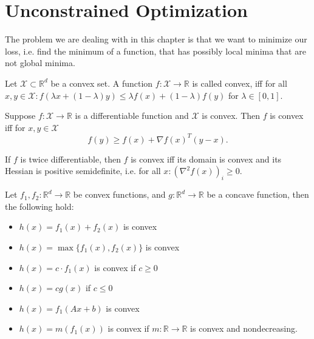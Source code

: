 \documentclass[12 pt]{article}        	%
\begin{document}
\section{Unconstrained Optimization}

The problem we are dealing with in this chapter is that we want to minimize our loss, i.e. find the minimum of a function, that has possibly local minima that are not global minima.

\begin{defi}
    Let $ \mathcal{ X } \subset \mathbb{ R }^d $ be a convex set.
    A function $ f \colon \mathcal{ X } \to \mathbb{ R } $ is called convex, iff for all $ x , y \in \mathcal{ X } \colon f ( \lambda x + ( 1 - \lambda ) y ) \leq \lambda f ( x ) + ( 1 - \lambda ) f ( y ) $ for $ \lambda \in [ 0 , 1 ] $.
\end{defi}

\begin{thm}
    Suppose $ f \colon \mathcal{ X } \to \mathbb{ R } $ is a differentiable function and $ \mathcal{ X } $ is convex. 
    Then $ f $ is convex iff for $ x , y \in \mathcal{ X } $
    \[
        f ( y ) \geq f ( x ) + \nabla f ( x )^T ( y - x ).
    \]
\end{thm}

\begin{lem}
    If $ f $ is twice differentiable, then $ f $ is convex iff its domain is convex and its Hessian is positive semidefinite, i.e. for all $ x  \colon ( \nabla^2 f ( x ) )_i \geq 0 $.
\end{lem}

\begin{prop}
    Let $ f_1 , f_2 \colon \mathbb{ R }^d \to \mathbb{ R } $ be convex functions, and $ g \colon \mathbb{ R }^d \to \mathbb{ R } $ be a concave function, then the following hold:
    \begin{itemize}
        \item 
        $ h ( x ) = f_1 ( x ) + f_2 ( x ) $ is convex 

        \item 
        $ h ( x ) = \max \{ f_1 ( x ) , f_2 ( x ) \} $ is convex

        \item 
        $ h ( x ) = c \cdot f_1 ( x ) $ is convex if $ c \geq 0 $

        \item 
        $ h ( x ) = c g ( x ) $ if $ c \leq 0 $

        \item 
        $ h ( x ) = f_1 ( A x + b ) $ is convex

        \item 
        $ h ( x ) = m ( f_1 ( x ) ) $ is convex if $ m \colon \mathbb{ R } \to \mathbb{ R } $ is convex and nondecreasing. 
    \end{itemize}
\end{prop}
\end{document}
